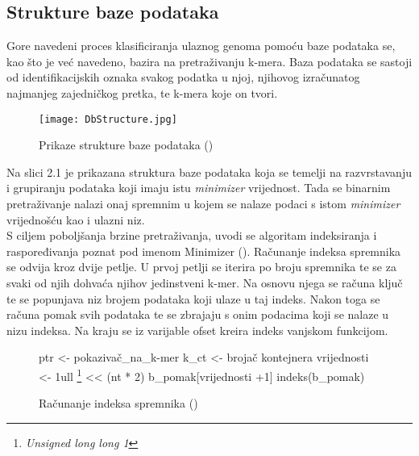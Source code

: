 \documentclass[times, utf8, zavrsni]{fer}
\begin{document}
\subsection{Strukture baze podataka}
Gore navedeni proces klasificiranja ulaznog genoma pomoću baze podataka se, kao što je već navedeno, bazira na pretraživanju k-mera. Baza podataka se sastoji od identifikacijskih oznaka svakog podatka u njoj, njihovog izračunatog najmanjeg zajedničkog pretka, te k-mera koje on tvori.\\
\begin{figure}[hbp]
	\centering
	\texttt{[image: DbStructure.jpg]}
	\caption{Prikaze strukture baze podataka (\cite{Kraken})}
	\label{BazaPodataka}
\end{figure}

Na slici 2.1 je prikazana struktura baze podataka koja se temelji na razvrstavanju i grupiranju podataka koji imaju istu \textit{minimizer} vrijednost. Tada se binarnim pretraživanje nalazi onaj spremnim u kojem se nalaze podaci s istom \textit{minimizer} vrijednošću kao i ulazni niz.
\\S ciljem poboljšanja brzine pretraživanja, uvodi se algoritam indeksiranja i raspoređivanja poznat pod imenom Minimizer (\cite{minim}). Računanje indeksa spremnika se odvija kroz dvije petlje. U prvoj petlji se iterira po broju spremnika te se za svaki od njih dohvaća njihov jedinstveni k-mer. Na osnovu njega se računa ključ te se popunjava niz brojem podataka koji ulaze u taj indeks. Nakon toga se računa pomak svih podataka te se zbrajaju s onim podacima koji se nalaze u nizu indeksa. Na kraju se iz varijable ofset kreira indeks vanjskom funkcijom.
 
\begin{figure}[hbp]
	\begin{algorithm}[H]
		ptr <- pokazivač\_na\_k-mer\;
		k\_ct <- brojač kontejnera\;
		vrijednosti <- 1ull \footnote{\textit{Unsigned long long 1}} << (nt * 2)\;
		b\_pomak[vrijednosti +1]\;
		indeks(b\_pomak)\;
		\caption{Računanje indeksa spremnika (\cite{Kraken})}
		\label{Indeks}
	\end{algorithm}
\end{figure}
\end{document}
